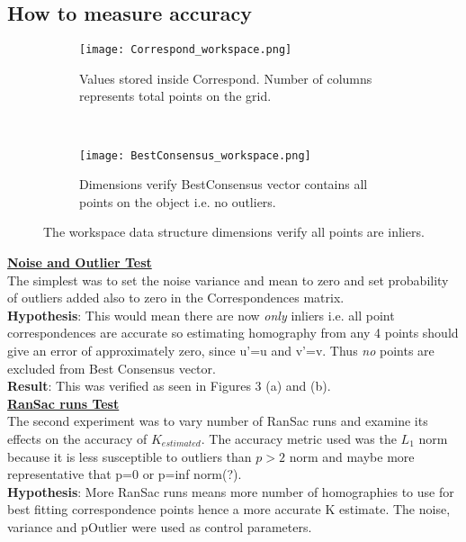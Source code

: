 \documentclass[titlepage]{article}
\begin{document}
\subsection{How to measure accuracy}
\label{Accuracy}
%
\begin{figure}[H]
\begin{center}
\begin{subfigure}{0.5\textwidth}
\label{Correspond}
\captionsetup{width=14cm}
\texttt{[image: Correspond\_workspace.png]}
\caption{Values stored inside Correspond. Number of columns represents total points on the grid.}
\end{subfigure}\\
\begin{subfigure}{0.5\textwidth}
\label{Consensus}
\captionsetup{width=14cm}
\texttt{[image: BestConsensus\_workspace.png]}
\caption{Dimensions verify BestConsensus vector contains all points on the object i.e. no outliers.}
\end{subfigure}
\caption{The workspace data structure dimensions verify all points are inliers.}
\end{center}
\end{figure}
\textbf{\underline{Noise and Outlier Test}}\\
The simplest was to set the noise variance and mean to zero and set probability of outliers added also to zero in the Correspondences matrix.\\
\textbf{Hypothesis}: This would mean there are now \textit{only} inliers i.e. all point correspondences are accurate so estimating homography from any 4 points should give an error of approximately zero, since u’=u and v’=v. Thus \textit{no} points are excluded from Best Consensus vector. \\
\textbf{Result}: This was verified as seen in Figures 3 (a) and (b).\\
\textbf{\underline{RanSac runs Test}}\\
The second experiment was to vary number of RanSac runs and examine its effects on the accuracy of $K_{estimated}$. The accuracy metric used was the $L_{1}$ norm because it is less susceptible to outliers than $p > 2$ norm and maybe more representative that p=0 or p=inf norm(?).\\
\textbf{Hypothesis}: More RanSac runs means more number of homographies to use for best fitting correspondence points hence a more accurate K estimate. The noise, variance and pOutlier were used as control parameters. \\
\end{document}
